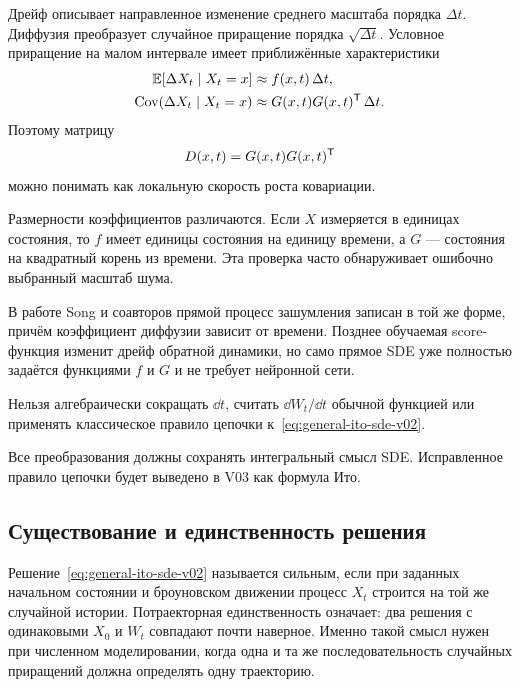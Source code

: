 Дрейф описывает направленное изменение среднего масштаба порядка $\Delta t$. Диффузия преобразует случайное приращение порядка $\sqrt{\Delta t}$. Условное приращение на малом интервале имеет приближённые характеристики
\begin{align}
\mathbb E[\Delta X_t\mid X_t=x]
&\approx
f(x,t)\,\Delta t,
\label{eq:local-drift-moment-v02}
\\
\operatorname{Cov}(\Delta X_t\mid X_t=x)
&\approx
G(x,t)G(x,t)^{\mathsf{T}}\,\Delta t.
\label{eq:local-diffusion-moment-v02}
\end{align}
Поэтому матрицу
\begin{equation}
\label{eq:diffusion-tensor-v02}
D(x,t)=G(x,t)G(x,t)^{\mathsf{T}}
\end{equation}
можно понимать как локальную скорость роста ковариации.

Размерности коэффициентов различаются. Если $X$ измеряется в единицах состояния, то $f$ имеет единицы состояния на единицу времени, а $G$ --- состояния на квадратный корень из времени. Эта проверка часто обнаруживает ошибочно выбранный масштаб шума.

В работе Song и соавторов прямой процесс зашумления записан в той же форме, причём коэффициент диффузии зависит от времени. Позднее обучаемая score-функция изменит дрейф обратной динамики, но само прямое SDE уже полностью задаётся функциями $f$ и $G$ и не требует нейронной сети.

\begin{caution}
Нельзя алгебраически сокращать $\dd t$, считать $\dd W_t/\dd t$ обычной функцией или применять классическое правило цепочки к~\eqref{eq:general-ito-sde-v02}.

Все преобразования должны сохранять интегральный смысл SDE. Исправленное правило цепочки будет выведено в V03 как формула Ито.
\end{caution}

\subsection{Существование и единственность решения}

Решение~\eqref{eq:general-ito-sde-v02} называется сильным, если при заданных начальном состоянии и броуновском движении процесс $X_t$ строится на той же случайной истории. Потраекторная единственность означает: два решения с одинаковыми $X_0$ и $W_t$ совпадают почти наверное. Именно такой смысл нужен при численном моделировании, когда одна и та же последовательность случайных приращений должна определять одну траекторию.

